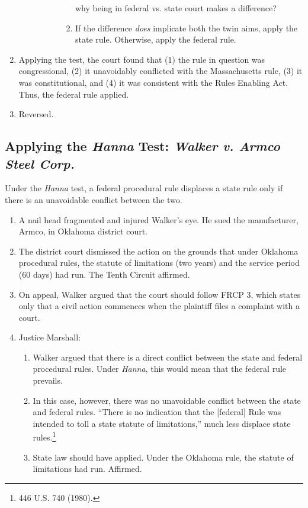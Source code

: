 \begin{enumerate}
\begin{enumerate}
\begin{enumerate}
\begin{itemize}
\begin{enumerate}
                    why being in federal vs. state court makes a difference?
                \item If the difference \emph{does} implicate both the twin 
                aims, apply the state rule. Otherwise, apply the federal rule.
                \end{enumerate}
            \end{itemize}
        \end{enumerate}
    \end{enumerate}
    \item Applying the test, the court found that (1) the rule in question was 
    congressional, (2) it unavoidably conflicted with the Massachusetts rule, 
    (3) it was constitutional, and (4) it was consistent with the Rules 
    Enabling Act. Thus, the federal rule applied.
    \item Reversed.
\end{enumerate}

\subsection{Applying the \emph{Hanna} Test: \emph{Walker v. Armco Steel Corp.}}

Under the \emph{Hanna} test, a federal procedural rule displaces a state rule 
only if there is an unavoidable conflict between the two.

\begin{enumerate}
    \item A nail head fragmented and injured Walker's eye. He sued the 
    manufacturer, Armco, in Oklahoma district court.
    \item The district court dismissed the action on the grounds that under 
    Oklahoma procedural rules, the statute of limitations (two years) and the 
    service period (60 days) had run. The Tenth Circuit affirmed.
    \item On appeal, Walker argued that the court should follow FRCP 3, which 
    states only that a civil action commences when the plaintiff files a 
    complaint with a court.
    \item Justice Marshall:
    \begin{enumerate}
        \item Walker argued that there is a direct conflict between the state 
        and federal procedural rules. Under \emph{Hanna}, this would mean that 
        the federal rule prevails.
        \item In this case, however, there was no unavoidable conflict between 
        the state and federal rules. ``There is no indication that the 
        [federal] Rule was intended to toll a state statute of limitations,'' 
        much less displace state rules.\footnote{446 U.S. 740 (1980).}
        \item State law should have applied. Under the Oklahoma rule, the 
        statute of limitations had run. Affirmed.
    \end{enumerate}
\end{enumerate}

